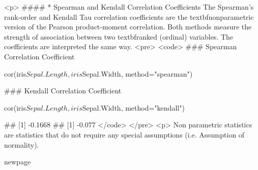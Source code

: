 <p>
####        * {Spearman and Kendall Correlation Coefficients}
The Spearman's rank-order and Kendall Tau correlation coefficients are the textbf{nonparametric} version of the Pearson product-moment correlation. Both methods measure the strength of association between two textbf{ranked} (ordinal) variables. The coefficients are interpreted the same way.
<pre>
	<code>
### Spearman Correlation Coefficient

cor(iris$Sepal.Length,iris$Sepal.Width, 
   method="spearman")
   
### Kendall Correlation Coefficient

cor(iris$Sepal.Length,iris$Sepal.Width, 
   method="kendall")

## [1] -0.1668
## [1] -0.077
	</code>
</pre>
<p>
Non parametric statistics are statistics that do not require any special assumptions (i.e. Assumption of normality).

newpage
